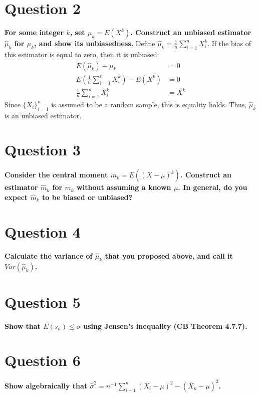 \documentclass{article}
\begin{document}

\section*{Question 2}
\textbf{For some integer $k$, set $\mu_k=E(X^k)$. Construct an unbiased estimator $\hat{\mu}_k$ for $\mu_k$, and show its unbiasedness.}
\bigskip
Define $\hat{\mu}_k = \frac{1}{n}\sum_{i=1}^nX_i^k$. If the bias of this estimator is equal to zero, then it is unbiased:
\begin{align*}
	E(\hat{\mu}_k)-\mu_k &= 0						\\
	E(\frac{1}{n}\sum_{i=1}^nX_i^k) - E(X^k) &= 0	\\
	\frac{1}{n}\sum_{i=1}^nX_i^k &= X^k
\end{align*}
Since $\{X_i\}_{i=1}^n$ is assumed to be a random sample, this is equality holds. Thus, $\hat{\mu}_k$ is an unbiased estimator.


\section*{Question 3}
\textbf{Consider the central moment $m_k=E((X-\mu)^k)$. Construct an estimator $\hat{m}_k$ for $m_k$ without assuming a known $\mu$. In general, do you expect $\hat{m}_k$ to be biased or unbiased?}
\bigskip


\section*{Question 4}
\textbf{Calculate the variance of $\hat{\mu}_k$ that you proposed above, and call it $Var(\hat{\mu}_k)$.}
\bigskip


\section*{Question 5}
\textbf{Show that $E(s_n)\leq\sigma$ using Jensen's inequality (CB Theorem 4.7.7).}
\bigskip


\section*{Question 6}
\textbf{Show algebraically that $\hat{\sigma}^2=n^{-1}\sum_{i-1}^n(X_i-\mu)^2-(\overline{X}_n-\mu)^2$.}
\bigskip
\end{document}
